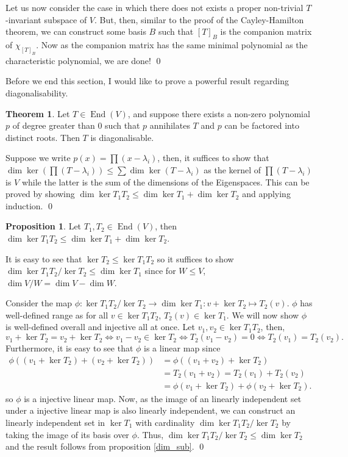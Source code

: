 \documentclass[
]{article}
\theoremstyle{definition}
\newtheorem{theorem}{Theorem}
\newtheorem{prop}{Proposition}[section]
\theoremstyle{definition}
\begin{document}
Let us now consider the case in which there does not exists a proper
non-trivial \(T\)-invariant subspace of \(V\). But, then, similar to the
proof of the Cayley-Hamilton theorem, we can construct some basis \(B\)
such that \([T]_B\) is the companion matrix of \(\chi_{[T]_B}\). Now as
the companion matrix has the same minimal polynomial as the
characteristic polynomial, we are done! \qed

Before we end this section, I would like to prove a powerful result
regarding diagonalisability.

\begin{theorem}\label{diag_distinct}
  Let \(T \in \mathop{\mathrm{End}}(V)\), and suppose there exists a non-zero polynomial \(p\) of 
  degree greater than 0 such that \(p\) annihilates \(T\) and \(p\) can be 
  factored into distinct roots. Then \(T\) is diagonalisable. 
\end{theorem}
\proof

Suppose we write \(p(x) = \prod(x - \lambda_i)\), then, it suffices to
show that
\(\dim \ker (\prod(T - \lambda_i)) \le \sum \dim \ker(T - \lambda_i)\)
as the kernel of \(\prod(T - \lambda_i)\) is \(V\) while the latter is
the sum of the dimensions of the Eigenspaces. This can be proved by
showing \(\dim \ker T_1 T_2 \le \dim \ker T_1 + \dim \ker T_2\) and
applying induction. \qed

\begin{prop}
  Let \(T_1, T_2 \in \mathop{\mathrm{End}}(V)\), then 
  \(\dim \ker T_1 T_2 \le \dim \ker T_1 + \dim \ker T_2\).
\end{prop}
\proof

It is easy to see that \(\ker T_2 \le \ker T_1 T_2\) so it suffices to
show \(\dim \ker T_1 T_2 / \ker T_2 \le \dim \ker T_1\) since for
\(W \le V\), \(\dim V / W = \dim V - \dim W\).

Consider the map
\(\phi : \ker T_1 T_2 / \ker T_2 \to \dim \ker T_1 :  v + \ker T_2 \mapsto T_2(v)\).
\(\phi\) has well-defined range as for all \(v \in \ker T_1 T_2\),
\(T_2(v) \in \ker T_1\). We will now show \(\phi\) is well-defined
overall and injective all at once. Let \(v_1, v_2 \in \ker T_1 T_2\),
then,
\[v_1 + \ker T_2 = v_2 + \ker T_2 \iff v_1 - v_2 \in \ker T_2 \iff T_2 (v_1 - v_2) = 0
  \iff T_2(v_1) = T_2(v_2).\] Furthermore, it is easy to see that
\(\phi\) is a linear map since \begin{align*}
    \phi((v_1 + \ker T_2) + (v_2 + \ker T_2)) & = \phi((v_1 + v_2) + \ker T_2) \\
      & = T_2(v_1 + v_2) = T_2(v_1) + T_2(v_2) \\
      & = \phi(v_1 + \ker T_2) + \phi(v_2 + \ker T_2).
  \end{align*} so \(\phi\) is a injective linear map. Now, as the image
of an linearly independent set under a injective linear map is also
linearly independent, we can construct an linearly independent set in
\(\ker T_1\) with cardinality \(\dim \ker T_1 T_2 / \ker T_2\) by taking
the image of its basis over \(\phi\). Thus,
\(\dim \ker T_1 T_2 / \ker T_2 \le \dim \ker T_2\) and the result
follows from proposition \ref{dim_sub}. \qed
\end{document}
